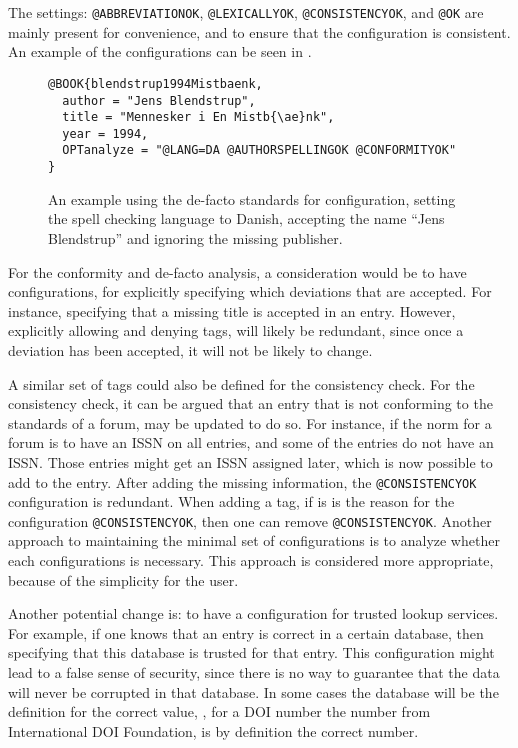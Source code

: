 The settings: \texttt{@ABBREVIATIONOK}, \texttt{@LEXICALLYOK},
\texttt{@CONSISTENCYOK}, and \texttt{@OK} are mainly present for
convenience, and to ensure that the configuration is consistent.  An
example of the configurations can be seen in
.

\begin{figure}
  \centering
\begin{verbatim}
@BOOK{blendstrup1994Mistbaenk,
  author = "Jens Blendstrup",
  title = "Mennesker i En Mistb{\ae}nk",
  year = 1994,
  OPTanalyze = "@LANG=DA @AUTHORSPELLINGOK @CONFORMITYOK"
}
\end{verbatim}
  \caption{An example using the de-facto standards for configuration,
    setting the spell checking language to Danish, accepting the name
    ``Jens Blendstrup'' and ignoring the missing publisher.}
  \label{fig:analyzing_added_de_facto_standards}
\end{figure}


For the conformity and de-facto analysis, a consideration would be to
have configurations, for explicitly specifying which deviations that
are accepted.  For instance, specifying that a missing title is
accepted in an entry.  However, explicitly allowing and denying tags,
will likely be redundant, since once a deviation has been accepted, it
will not be likely to change.

A similar set of tags could also be defined for the consistency check.
For the consistency check, it can be argued that an entry that is not
conforming to the standards of a forum, may be updated to do so.  For
instance, if the norm for a forum is to have an ISSN on all entries,
and some of the entries do not have an ISSN.  Those entries might get
an ISSN assigned later, which is now possible to add to the entry.
After adding the missing information, the \texttt{@CONSISTENCYOK}
configuration is redundant.  When adding a tag, if is is the reason
for the configuration \texttt{@CONSISTENCYOK}, then one can remove
\texttt{@CONSISTENCYOK}.  Another approach to maintaining the minimal
set of configurations is to analyze whether each configurations is
necessary.  This approach is considered more appropriate, because of
the simplicity for the user.

Another potential change is: to have a configuration for trusted
lookup services.  For example, if one knows that an entry is correct
in a certain database, then specifying that this database is trusted
for that entry.  This configuration might lead to a false sense of
security, since there is no way to guarantee that the data will never
be corrupted in that database.  In some cases the database will be the
definition for the correct value, \eg, for a DOI number the number
from International DOI Foundation, is by definition the correct
number.

